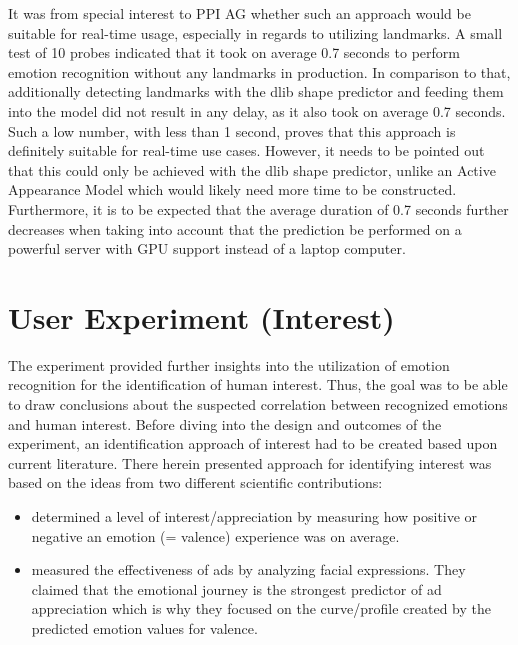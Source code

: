 \noindent It was from special interest to PPI AG whether such an approach would be suitable for real-time usage, especially in regards to utilizing landmarks. 
\newline\newline
A small test of 10 probes indicated that it took on average 0.7 seconds to perform emotion recognition without any landmarks in production. In comparison to that, additionally detecting landmarks with the dlib shape predictor \citep{Kazemi:2014:ShapePredictor} and feeding them into the model did not result in any delay, as it also took on average 0.7 seconds. Such a low number, with less than 1 second, proves that this approach is definitely suitable for real-time use cases. 
\newline\newline
However, it needs to be pointed out that this could only be achieved with the dlib shape predictor, unlike an Active Appearance Model which would likely need more time to be constructed. Furthermore, it is to be expected that the average duration of 0.7 seconds further decreases when taking into account that the prediction be performed on a powerful server with GPU support instead of a laptop computer.

\section{User Experiment (Interest)}
The experiment provided further insights into the utilization of emotion recognition for the identification of human interest. Thus, the goal was to be able to draw conclusions about the suspected correlation between recognized emotions and human interest. Before diving into the design and outcomes of the experiment, an identification approach of interest had to be created based upon current literature.
\newline\newline
There herein presented approach for identifying interest was based on the ideas from two different scientific contributions:
\begin{itemize}
    \item \citet{Kamaruddin:2016:MeasuringCustomerSatisfaction} determined a level of interest/appreciation by measuring how positive or negative an emotion (= valence) experience was on average.
    \item \citet{Poirier:2016:AdsFacialExpression} measured the effectiveness of ads by analyzing facial expressions. They claimed that the emotional journey is the strongest predictor of ad appreciation which is why they focused on the curve/profile created by the predicted emotion values for valence.
\end{itemize}

